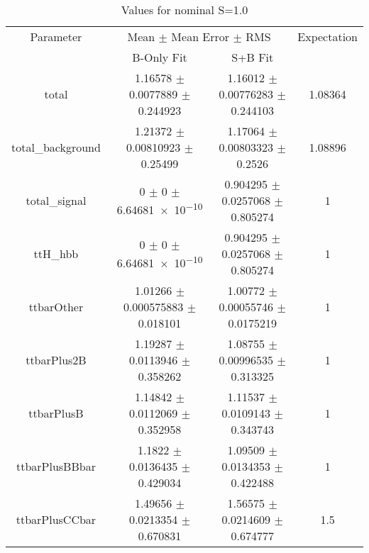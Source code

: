 \begin{table}
\centering
\caption{Values for nominal S=1.0}
\begin{tabular}{cccc}
\toprule
Parameter & \multicolumn{2}{c}{Mean $\pm$ Mean Error $\pm$ RMS} & Expectation\\
 & B-Only Fit & S+B Fit & \\
\midrule
total & \num{1.16578} $\pm$ \num{0.0077889} $\pm$ \num{0.244923} & \num{1.16012} $\pm$ \num{0.00776283} $\pm$ \num{0.244103} & \num{1.08364}\\
total\_background & \num{1.21372} $\pm$ \num{0.00810923} $\pm$ \num{0.25499} & \num{1.17064} $\pm$ \num{0.00803323} $\pm$ \num{0.2526} & \num{1.08896}\\
total\_signal & \num{0} $\pm$ \num{0} $\pm$ \num{6.64681e-10} & \num{0.904295} $\pm$ \num{0.0257068} $\pm$ \num{0.805274} & \num{1}\\
ttH\_hbb & \num{0} $\pm$ \num{0} $\pm$ \num{6.64681e-10} & \num{0.904295} $\pm$ \num{0.0257068} $\pm$ \num{0.805274} & \num{1}\\
ttbarOther & \num{1.01266} $\pm$ \num{0.000575883} $\pm$ \num{0.018101} & \num{1.00772} $\pm$ \num{0.00055746} $\pm$ \num{0.0175219} & \num{1}\\
ttbarPlus2B & \num{1.19287} $\pm$ \num{0.0113946} $\pm$ \num{0.358262} & \num{1.08755} $\pm$ \num{0.00996535} $\pm$ \num{0.313325} & \num{1}\\
ttbarPlusB & \num{1.14842} $\pm$ \num{0.0112069} $\pm$ \num{0.352958} & \num{1.11537} $\pm$ \num{0.0109143} $\pm$ \num{0.343743} & \num{1}\\
ttbarPlusBBbar & \num{1.1822} $\pm$ \num{0.0136435} $\pm$ \num{0.429034} & \num{1.09509} $\pm$ \num{0.0134353} $\pm$ \num{0.422488} & \num{1}\\
ttbarPlusCCbar & \num{1.49656} $\pm$ \num{0.0213354} $\pm$ \num{0.670831} & \num{1.56575} $\pm$ \num{0.0214609} $\pm$ \num{0.674777} & \num{1.5}\\
\bottomrule
\end{tabular}
\end{table}
